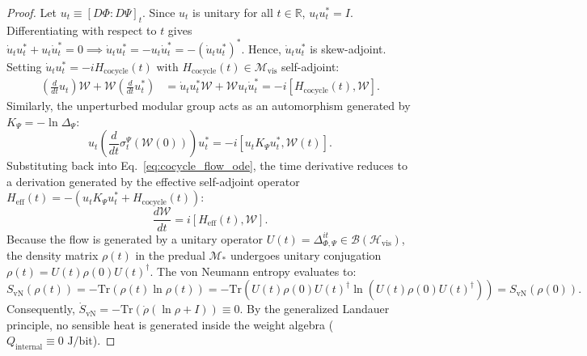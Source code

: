 \documentclass[11pt,onecolumn]{article}
\begin{document}
\begin{proof}
Let $u_t \equiv [D\Phi : D\Psi]_t$. Since $u_t$ is unitary for all $t \in \mathbb{R}$, $u_t u_t^* = I$. Differentiating with respect to $t$ gives $\dot{u}_t u_t^* + u_t \dot{u}_t^* = 0 \implies \dot{u}_t u_t^* = - u_t \dot{u}_t^* = - (\dot{u}_t u_t^*)^*$. Hence, $\dot{u}_t u_t^*$ is skew-adjoint. Setting $\dot{u}_t u_t^* = -i H_{\text{cocycle}}(t)$ with $H_{\text{cocycle}}(t) \in \mathcal{M}_{\text{vis}}$ self-adjoint:
\begin{align}
    \left( \frac{d}{dt} u_t \right) \mathcal{W} + \mathcal{W} \left( \frac{d}{dt} u_t^* \right) &= \dot{u}_t u_t^* \mathcal{W} + \mathcal{W} u_t \dot{u}_t^* = -i \left[ H_{\text{cocycle}}(t), \mathcal{W} \right].
\end{align}
Similarly, the unperturbed modular group acts as an automorphism generated by $K_\Psi = -\ln \Delta_\Psi$:
\begin{equation}
    u_t \left( \frac{d}{dt} \sigma_t^\Psi(\mathcal{W}(0)) \right) u_t^* = -i \left[ u_t K_\Psi u_t^*, \mathcal{W}(t) \right].
\end{equation}
Substituting back into Eq.~\eqref{eq:cocycle_flow_ode}, the time derivative reduces to a derivation generated by the effective self-adjoint operator $H_{\text{eff}}(t) = -(u_t K_\Psi u_t^* + H_{\text{cocycle}}(t))$:
\begin{equation}
    \frac{d\mathcal{W}}{dt} = i \left[ H_{\text{eff}}(t), \mathcal{W} \right].
\end{equation}
Because the flow is generated by a unitary operator $U(t) = \Delta_{\Phi, \Psi}^{it} \in \mathcal{B}(\mathcal{H}_{\text{vis}})$, the density matrix $\rho(t)$ in the predual $\mathcal{M}_*$ undergoes unitary conjugation $\rho(t) = U(t)\rho(0)U(t)^\dagger$. The von Neumann entropy evaluates to:
\begin{equation}
    S_{\text{vN}}(\rho(t)) = -\mathrm{Tr}(\rho(t) \ln \rho(t)) = -\mathrm{Tr}\left(U(t) \rho(0) U(t)^\dagger \ln (U(t) \rho(0) U(t)^\dagger)\right) = S_{\text{vN}}(\rho(0)).
\end{equation}
Consequently, $\dot{S}_{\text{vN}} = -\mathrm{Tr}(\dot{\rho}(\ln \rho + I)) \equiv 0$. By the generalized Landauer principle, no sensible heat is generated inside the weight algebra ($Q_{\text{internal}} \equiv 0\text{ J/bit}$).
\end{proof}
\end{document}
